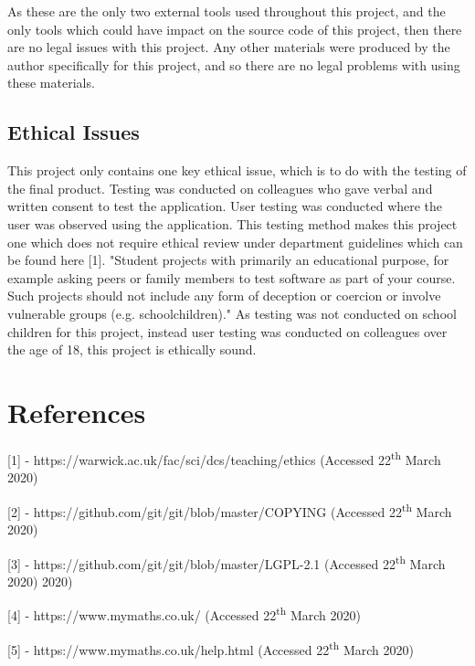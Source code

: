 \documentclass{article}
\begin{document}
As these are the only two external tools used throughout this project, and the only tools which could have impact on the source code of this project, then there are no legal issues with this project. Any other materials were produced by the author specifically for this project, and so there are no legal problems with using these materials. \par

\subsection{Ethical Issues}

This project only contains one key ethical issue, which is to do with the testing of the final product. Testing was conducted on colleagues who gave verbal and written consent to test the application. User testing was conducted where the user was observed using the application. This testing method makes this project one which does not require ethical review under department guidelines which can be found here [1]. "Student projects with primarily an educational purpose, for example asking peers or family members to test software as part of your course. Such projects should not include any form of deception or coercion or involve vulnerable groups (e.g. schoolchildren)." As testing was not conducted on school children for this project, instead user testing was conducted on colleagues over the age of 18, this project is ethically sound. 

\section{References}
\label{section:references}

[1] - https://warwick.ac.uk/fac/sci/dcs/teaching/ethics (Accessed 22\textsuperscript{th} March 2020) \par

[2] - https://github.com/git/git/blob/master/COPYING (Accessed 22\textsuperscript{th} March 2020) \par

[3] - https://github.com/git/git/blob/master/LGPL-2.1 (Accessed 22\textsuperscript{th} March 2020) 2020) \par

[4] - https://www.mymaths.co.uk/ (Accessed 22\textsuperscript{th} March 2020) \par

[5] - https://www.mymaths.co.uk/help.html (Accessed 22\textsuperscript{th} March 2020) \par
\end{document}
